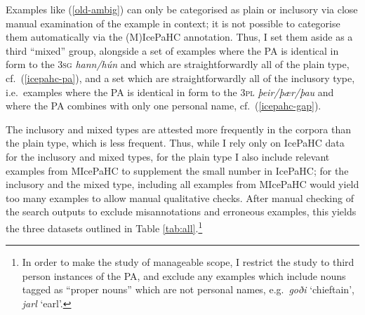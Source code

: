 \documentclass[output=paper,colorlinks,citecolor=brown]{langscibook}
\begin{document}
\ea \label{old-ambig} 



\z 
\z


Examples like (\ref{old-ambig}) can only be categorised as plain or inclusory via close manual examination of the example in context; it is not possible to categorise them automatically via the (M)IcePaHC annotation. Thus, I set them aside as a third ``mixed'' group, alongside a set of examples where the PA is identical in form to the 3\textsc{sg}  \textit{hann/hún} and which are straightforwardly all of the plain type, cf.~(\ref{icepahc-pa}), and  a set which are straightforwardly all of the inclusory type, i.e.~examples where the PA is identical in form to the 3\textsc{pl}  \textit{þeir/þær/þau} and where the PA combines with only one personal name, cf.~(\ref{icepahc-gap}).



The inclusory and mixed types are attested more frequently in the corpora than the plain type, which is less frequent. Thus, while I rely only on IcePaHC data for the inclusory and mixed types, for the plain type I also include relevant examples from MIcePaHC to supplement the small number in IcePaHC; for the inclusory and the mixed type, including all examples from MIcePaHC would yield too many examples to allow manual qualitative checks. After manual checking of the search outputs to exclude misannotations and erroneous examples, this yields the three datasets outlined in Table \ref{tab:all}.\footnote{In order to make the study of manageable scope, I restrict the study to third person instances of the PA, and exclude any examples which include nouns tagged as ``proper nouns'' which are not personal names, e.g.~\textit{goði} `chieftain', \textit{jarl} `earl'.
}
\end{document}
